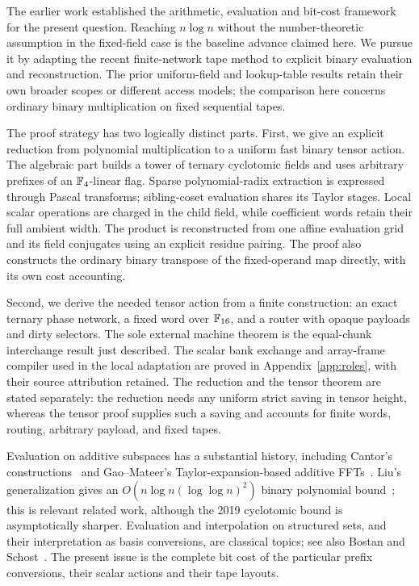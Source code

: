 The earlier work established the arithmetic, evaluation and bit-cost
framework for the present question. Reaching $n\log n$ without the
number-theoretic assumption in the fixed-field case is the baseline
advance claimed here. We pursue it by adapting the recent finite-network
tape method to explicit binary evaluation and reconstruction.
The prior uniform-field and lookup-table results retain their own
broader scopes or different access models; the comparison here concerns
ordinary binary multiplication on fixed sequential tapes.

The proof strategy has two logically distinct parts. First, we give an explicit reduction from polynomial multiplication to a uniform fast binary tensor action. The algebraic part builds a tower of ternary cyclotomic fields and uses arbitrary prefixes of an $\mathbb F_4$-linear flag. Sparse polynomial-radix extraction is expressed through Pascal transforms; sibling-coset evaluation shares its Taylor stages. Local scalar operations are charged in the child field, while coefficient words retain their full ambient width. The product is reconstructed from one affine evaluation grid and its field conjugates using an explicit residue pairing. The proof also constructs the ordinary binary transpose of the fixed-operand map directly, with its own cost accounting.

Second, we derive the needed tensor action from a finite construction: an exact ternary phase network, a fixed word over $\mathbb F_{16}$, and a router with opaque payloads and dirty selectors. The sole external machine theorem is the equal-chunk interchange result just described. The scalar bank exchange and array-frame compiler used in the local adaptation are proved in Appendix~\ref{app:roles}, with their source attribution retained. The reduction and the tensor theorem are stated separately: the reduction needs any uniform strict saving in tensor height, whereas the tensor proof supplies such a saving and accounts for finite words, routing, arbitrary payload, and fixed tapes.

Evaluation on additive subspaces has a substantial history, including
Cantor's constructions~\cite{Cantor89} and Gao--Mateer's
Taylor-expansion-based additive FFTs~\cite{GaoMateer10}. Liu's
generalization gives an $O(n\log n(\log\log n)^2)$ binary
polynomial bound~\cite{Liu25}; this is relevant related work, although
the 2019 cyclotomic bound is asymptotically sharper.
Evaluation and interpolation on structured sets, and their
interpretation as basis conversions, are classical topics; see also
Bostan and Schost~\cite{BostanSchost05}. The present issue is the complete bit cost of the particular prefix conversions, their scalar actions and their tape layouts.

